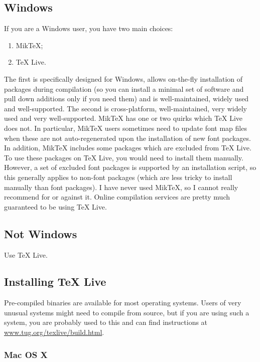 \subsection<1-| beamer:0>{Windows}

If you are a Windows user, you have two main choices:
\begin{enumerate}
  \item Mik\TeX{};
  \item \TeX{} Live.
\end{enumerate}
The first is specifically designed for Windows, allows on-the-fly installation of packages during compilation (so you can install a minimal set of software and pull down additions only if you need them) and is well-maintained, widely used and well-supported.
The second is cross-platform, well-maintained, very widely used and very well-supported.
Mik\TeX{} has one or two quirks which \TeX{} Live does not.
In particular, Mik\TeX{} users sometimes need to update font map files when these are not auto-regenerated upon the installation of new font packages. 
In addition, Mik\TeX{} includes some packages which are excluded from \TeX{} Live.
To use these packages on \TeX{} Live, you would need to install them manually.
However, a set of excluded font packages is supported by an installation script, so this generally applies to non-font packages (which are less tricky to install manually than font packages).
I have never used Mik\TeX{}, so I cannot really recommend for or against it.
Online compilation services are pretty much guaranteed to be using \TeX{} Live.

\subsection<1-| beamer:0>{Not Windows}

Use \TeX{} Live.

\subsection<1-| beamer:0>{Installing \TeX{} Live}

Pre-compiled binaries are available for most operating systems.
Users of very unusual systems might need to compile from source, but if you are using such a system, you are probably used to this and can find instructions at \url{www.tug.org/texlive/build.html}.

\subsubsection<1-| beamer:0>{Mac OS X}

